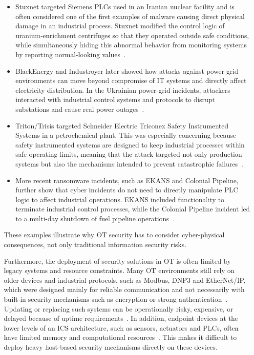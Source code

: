 \begin{itemize}
\item Stuxnet targeted Siemens PLCs used in an Iranian nuclear facility and is often considered one of the first examples of malware causing direct physical damage in an industrial process. Stuxnet modified the control logic of uranium-enrichment centrifuges so that they operated outside safe conditions, while simultaneously hiding this abnormal behavior from monitoring systems by reporting normal-looking values~\cite{kapoor_cyber_2025, cabana_detecting_2019}.


\item BlackEnergy and Industroyer later showed how attacks against power-grid environments can move beyond compromise of IT systems and directly affect electricity distribution. In the Ukrainian power-grid incidents, attackers interacted with industrial control systems and protocols to disrupt substations and cause real power outages~\cite{kapoor_cyber_2025, cabana_detecting_2019}.

\item Triton/Trisis targeted Schneider Electric Triconex Safety Instrumented Systems in a petrochemical plant. This was especially concerning because safety instrumented systems are designed to keep industrial processes within safe operating limits, meaning that the attack targeted not only production systems but also the mechanisms intended to prevent catastrophic failures~\cite{kapoor_cyber_2025, wang_guardians_2026}.

\item More recent ransomware incidents, such as EKANS and Colonial Pipeline, further show that cyber incidents do not need to directly manipulate PLC logic to affect industrial operations. EKANS included functionality to terminate industrial control processes, while the Colonial Pipeline incident led to a multi-day shutdown of fuel pipeline operations~\cite{kapoor_cyber_2025,  ding_data-driven_2022}.


\end{itemize}

These examples illustrate why OT security has to consider cyber-physical consequences, not only traditional information security risks.


Furthermore, the deployment of security solutions in OT is often limited by legacy systems and resource constraints. Many OT environments still rely on older devices and industrial protocols, such as Modbus, DNP3 and EtherNet/IP, which were designed mainly for reliable communication and not necessarily with built-in security mechanisms such as encryption or strong authentication~\cite{wang_guardians_2026, kapoor_cyber_2025}. Updating or replacing such systems can be operationally risky, expensive, or delayed because of uptime requirements~\cite{abshari_survey_2025, kapoor_cyber_2025}. In addition, endpoint devices at the lower levels of an ICS architecture, such as sensors, actuators and PLCs, often have limited memory and computational resources~\cite{abshari_survey_2025, jeffrey_hybrid_2024}. This makes it difficult to deploy heavy host-based security mechanisms directly on these devices.


